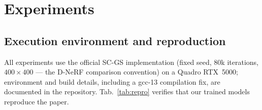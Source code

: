 \documentclass[10pt,twocolumn]{article}
\begin{document}
\section{Experiments}
\label{sec:experiments}

\subsection{Execution environment and reproduction}
\label{sec:setup}

All experiments use the official SC-GS implementation (fixed seed, 80k
iterations, $400\times400$ --- the D-NeRF comparison convention) on a Quadro
RTX~5000; environment and build details, including a gcc-13 compilation fix,
are documented in the repository. Tab.~\ref{tab:repro} verifies that our
trained models reproduce the paper.
\end{document}
